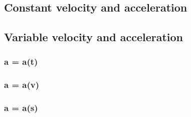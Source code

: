 \subsection{Constant velocity and acceleration}

\subsection{Variable velocity and acceleration}

\subsubsection{a = a(t)}

\subsubsection{a = a(v)}

\subsubsection{a = a(s)}